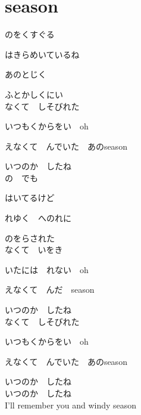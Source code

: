 \section{ season}
\large{

のをくすぐる

はきらめいているね

あのとじく

ふとかしくにい
\\

なくて　しそびれた

いつもくからをい　oh

えなくて　んでいた　あのseason

いつのか　したね
\\

の　でも

はいてるけど

れゆく　へのれに

のをらされた
\\

なくて　いをき

いたには　れない　oh

えなくて　んだ　season

いつのか　したね
\\

なくて　しそびれた

いつもくからをい　oh

えなくて　んでいた　あのseason

いつのか　したね
\\

いつのか　したね
\\

I'll remember you and windy season

}